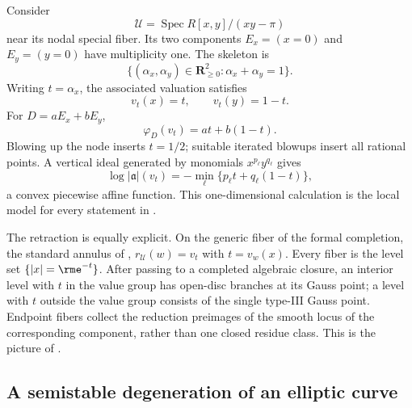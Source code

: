 Consider
\[
                 \mathcal U=\operatorname{Spec}
                 R[x,y]/(xy-\pi)
\]
near its nodal special fiber. Its two components $E_x=(x=0)$ and
$E_y=(y=0)$ have multiplicity one. The skeleton is
\[
 \{(\alpha_x,\alpha_y)\in\mathbf R_{\geq0}^2:
                         \alpha_x+\alpha_y=1\}.
\]
Writing $t=\alpha_x$, the associated valuation satisfies
\[
                         v_t(x)=t,\qquad v_t(y)=1-t.
\]
For $D=aE_x+bE_y$,
\[
                         \varphi_D(v_t)=at+b(1-t).
\]
Blowing up the node inserts $t=1/2$; suitable iterated blowups insert all
rational points. A vertical ideal generated by monomials
$x^{p_\ell}y^{q_\ell}$ gives
\[
 \log|\mathfrak a|(v_t)
   =-\min_\ell\{p_\ell t+q_\ell(1-t)\},
\]
a convex piecewise affine function. This one-dimensional calculation is the
local model for every statement in
.

The retraction is equally explicit. On the generic fiber of the formal
completion, the standard annulus of ,
$r_{\mathcal U}(w)=v_t$ with $t=v_w(x)$. Every fiber is the level set
$\{|x|=\rme^{-t}\}$. After passing to a completed algebraic closure,
an interior level with $t$ in the value group has open-disc branches at
its Gauss point; a level with $t$ outside the value group consists of the
single type-III Gauss point. Endpoint fibers collect the reduction preimages
of the smooth locus of the corresponding component, rather than one closed
residue class. This is the picture of .

\subsection{A semistable degeneration of an elliptic curve}
\label{sec:worked-tate}

